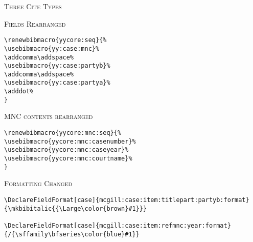 %
%


\bigskip\textsc{Three Cite Types}




\bigskip\textsc{Fields Rearranged}


\begin{verbatim}
\renewbibmacro{yycore:seq}{%
\usebibmacro{yy:case:mnc}%
\addcomma\addspace%
\usebibmacro{yy:case:partyb}%
\addcomma\addspace%
\usebibmacro{yy:case:partya}%
\adddot%
}
\end{verbatim}

\bigskip\textsc{MNC contents rearranged}




\begin{verbatim}
\renewbibmacro{yycore:mnc:seq}{%
\usebibmacro{yycore:mnc:casenumber}%
\usebibmacro{yycore:mnc:caseyear}%
\usebibmacro{yycore:mnc:courtname}%
}
\end{verbatim}

\bigskip\textsc{Formatting Changed}



\begin{verbatim}
\DeclareFieldFormat[case]{mcgill:case:item:titlepart:partyb:format}
{\mkbibitalic{{\Large\color{brown}#1}}}

\DeclareFieldFormat[case]{mcgill:case:item:refmnc:year:format}
{/{\sffamily\bfseries\color{blue}#1}}
\end{verbatim}


